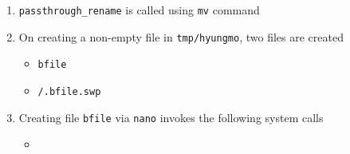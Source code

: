 \documentclass[12pt]{article}
\begin{document}
\begin{enumerate}[1.]
    \item \texttt{passthrough\_rename} is called using \texttt{mv} command
    \item On creating a non-empty file in \texttt{tmp/hyungmo}, two files are created

    \begin{itemize}
        \item \texttt{bfile}
        \item \texttt{/.bfile.swp}
    \end{itemize}


    \item Creating file \texttt{bfile} via \texttt{nano} invokes the following system calls

    \begin{itemize}
        \item
    \end{itemize}

\end{enumerate}
\end{document}
